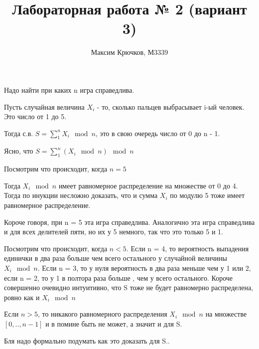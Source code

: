 \documentclass{article}
\author{Максим Крючков, М3339}
\title{Лабораторная работа № 2 (вариант 3)}
\begin{document}
Надо найти при каких n игра справедлива.

Пусть случайная величина $X_i$ - то, сколько пальцев выбрасывает i-ый человек. Это число от 1 до 5.

Тогда с.в. $S = \sum\limits_1^n{X_i} \mod n$, это в свою очередь число от 0 до n - 1.

Ясно, что $S = \sum\limits_1^n{(X_i \mod n)} \mod n$

Посмотрим что происходит, когда $n = 5$

Тогда $X_i \mod n$ имеет равномерное распределение на множестве от 0 до 4. Тогда по инукции несложно доказать, что и сумма $X_i$ по модулю 5 тоже имеет равномерное распределение.

Короче говоря, при n = 5 эта игра справедлива. Аналогично эта игра справедлива и для всех делителей пяти, но их у 5 немного, так что это только 5 и 1.

Посмотрим что происходит, когда $n < 5$. Если n = 4, то вероятность выпадения единички в два раза больше чем всего остального у случайной величины $X_i \mod n$. Если n = 3, то у нуля вероятность в два раза меньше чем у 1 или 2, если n = 2, то у 1 в полтора раза больше , чем у всего остального. Короче совершенно очевидно интуитивно, что S тоже не будет равномерно распределена, ровно как и $X_i \mod n$

Если $n > 5$, то никакого равномерного распределения $X_i \mod n$ на множестве $[0, .., n - 1]$ и в помине быть не может, а значит и для S.

Бля надо формально подумать как это доказать для S..
\end{document}
